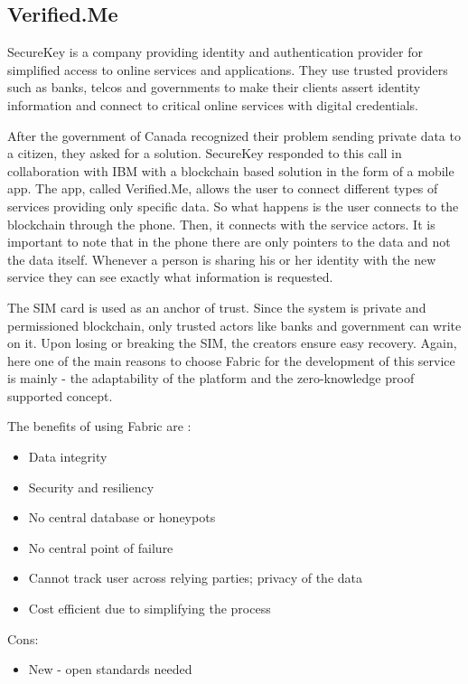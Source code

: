 \documentclass[a4paper,11pt]{report}
\begin{document}
\subsection{Verified.Me}
\label{verifyMe}
SecureKey is a company providing identity and authentication provider for simplified access to online services and applications. They use trusted providers such as banks, telcos and governments to make their clients assert identity information and connect to critical online services with digital credentials.

After the government of Canada recognized their problem sending private data to a citizen, they asked for a solution. SecureKey responded to this call in collaboration with IBM with a blockchain based solution in the form of a mobile app. The app, called Verified.Me, allows the user to connect different types of services providing only specific data. So what happens is the user connects to the blockchain through the phone. Then, it connects with the service actors. It is important to note that in the phone there are only pointers to the data and not the data itself. Whenever a person is sharing his or her identity with the new service they can see exactly what information is requested.  \cite{verifyMe}

	The SIM card is used as an anchor of trust. Since the system is private and permissioned blockchain, only trusted actors like banks and government can write on it. Upon losing or breaking the SIM, the creators ensure easy recovery. 
Again, here one of the main reasons to choose Fabric for the development of this service is mainly - the adaptability of the platform and the zero-knowledge proof supported concept. \cite{verifyMeDemo}

The benefits of using Fabric are : 
\begin{itemize}
\item Data integrity 
\item Security and resiliency
\item No central database or honeypots 
\item No central point of failure
\item Cannot track user across relying parties; privacy of the data
\item Cost efficient due to simplifying the process
\end{itemize}
Cons: 
\begin{itemize}
\item New - open standards needed 
\end{itemize}
\end{document}
